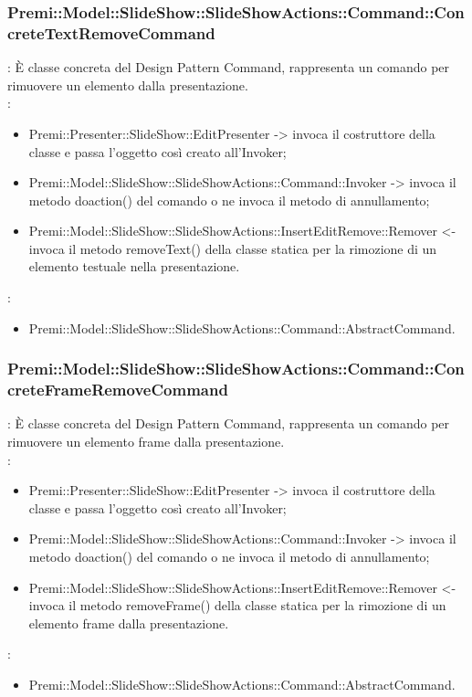 {     \subsubsection{Premi::Model::SlideShow::SlideShowActions::Command::ConcreteTextRemoveCommand}{
				\textbf{\tipo}: È classe concreta del Design Pattern Command, rappresenta un comando per rimuovere un elemento dalla presentazione.\\	
				\textbf{\relaz}: 
				\begin{itemize}
					\item Premi::Presenter::SlideShow::EditPresenter -> invoca il costruttore della classe e passa l’oggetto così creato all’Invoker;
					\item Premi::Model::SlideShow::SlideShowActions::Command::Invoker -> invoca il metodo doaction() del comando o ne invoca il metodo di annullamento;
                    \item Premi::Model::SlideShow::SlideShowActions::InsertEditRemove::Remover <- invoca il metodo removeText() della classe statica per la rimozione di un elemento testuale nella presentazione.
				\end{itemize}	
                \textbf{\base}: 
                    \begin{itemize}
                    \item Premi::Model::SlideShow::SlideShowActions::Command::AbstractCommand.
                    \end{itemize}
                    }
        \subsubsection{Premi::Model::SlideShow::SlideShowActions::Command::ConcreteFrameRemoveCommand}{
				\textbf{\tipo}: È classe concreta del Design Pattern Command, rappresenta un comando per rimuovere un elemento frame dalla presentazione.\\	
				\textbf{\relaz}: 
				\begin{itemize}
					\item Premi::Presenter::SlideShow::EditPresenter -> invoca il costruttore della classe e passa l’oggetto così creato all’Invoker;
					\item Premi::Model::SlideShow::SlideShowActions::Command::Invoker -> invoca il metodo doaction() del comando o ne invoca il metodo di annullamento;
                    \item Premi::Model::SlideShow::SlideShowActions::InsertEditRemove::Remover <- invoca il metodo removeFrame() della classe statica per la rimozione di un elemento frame dalla presentazione.
				\end{itemize}	
                \textbf{\base}: 
                    \begin{itemize}
                    \item Premi::Model::SlideShow::SlideShowActions::Command::AbstractCommand.
                    \end{itemize}
                    }                   
}
